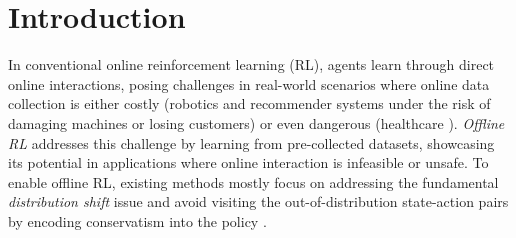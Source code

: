 \section{Introduction}
\label{sec:intro}

In conventional online reinforcement learning (RL), agents learn through direct online interactions, posing challenges in real-world scenarios where online data collection is either costly (\eg robotics \citep{kalashnikov2018scalable, ibarz2021train} and recommender systems \citep{afsar2022reinforcement, zhao2021dear} under the risk of damaging machines or losing customers) or even dangerous (\eg healthcare \citep{yu2021reinforcement, yom2017encouraging}). \textit{Offline RL} addresses this challenge by learning from pre-collected datasets, showcasing its potential in applications where online interaction is infeasible or unsafe.
To enable offline RL, existing methods mostly focus on addressing the fundamental \textit{distribution shift} issue and avoid visiting the out-of-distribution state-action pairs by encoding conservatism into the policy \citep{levine2020offline,kumar2020conservative}.

